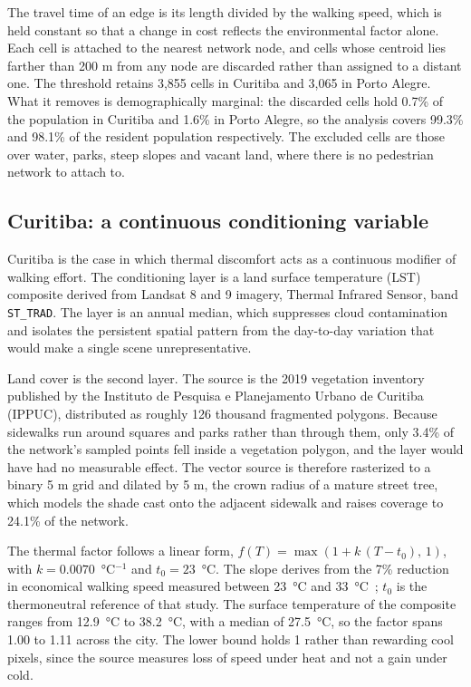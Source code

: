 The travel time of an edge is its length divided by the walking speed, which is held constant so that a change in cost reflects the environmental factor alone. Each cell is attached to the nearest network node, and cells whose centroid lies farther than 200 m from any node are discarded rather than assigned to a distant one. The threshold retains 3{,}855 cells in Curitiba and 3{,}065 in Porto Alegre. What it removes is demographically marginal: the discarded cells hold 0.7\% of the population in Curitiba and 1.6\% in Porto Alegre, so the analysis covers 99.3\% and 98.1\% of the resident population respectively. The excluded cells are those over water, parks, steep slopes and vacant land, where there is no pedestrian network to attach to.

\subsection{Curitiba: a continuous conditioning variable}
\label{subsec:curitiba}

Curitiba is the case in which thermal discomfort acts as a continuous modifier of walking effort. The conditioning layer is a land surface temperature (LST) composite derived from Landsat 8 and 9 imagery, Thermal Infrared Sensor, band \texttt{ST\_TRAD}. The layer is an annual median, which suppresses cloud contamination and isolates the persistent spatial pattern from the day-to-day variation that would make a single scene unrepresentative.

Land cover is the second layer. The source is the 2019 vegetation inventory published by the Instituto de Pesquisa e Planejamento Urbano de Curitiba (IPPUC), distributed as roughly 126 thousand fragmented polygons. Because sidewalks run around squares and parks rather than through them, only 3.4\% of the network's sampled points fell inside a vegetation polygon, and the layer would have had no measurable effect. The vector source is therefore rasterized to a binary 5 m grid and dilated by 5 m, the crown radius of a mature street tree, which models the shade cast onto the adjacent sidewalk and raises coverage to 24.1\% of the network.

The thermal factor follows a linear form, $f(T) = \max\left(1 + k\,(T - t_0),\, 1\right)$, with $k = 0.0070$~°C$^{-1}$ and $t_0 = 23$~°C. The slope derives from the 7\% reduction in economical walking speed measured between 23~°C and 33~°C~\cite{Horiuchi2018Economical}; $t_0$ is the thermoneutral reference of that study. The surface temperature of the composite ranges from 12.9~°C to 38.2~°C, with a median of 27.5~°C, so the factor spans 1.00 to 1.11 across the city. The lower bound holds 1 rather than rewarding cool pixels, since the source measures loss of speed under heat and not a gain under cold.

